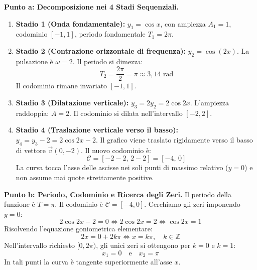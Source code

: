 \documentclass[11pt,a4paper,oneside]{report}
\begin{document}
\begin{dimostrazione}
\textbf{Punto a: Decomposizione nei 4 Stadi Sequenziali.}
\begin{enumerate}
    \item \textbf{Stadio 1 (Onda fondamentale):} $y_1 = \cos x$, con ampiezza $A_1 = 1$, codominio $[-1, 1]$, periodo fondamentale $T_1 = 2\pi$.
    \item \textbf{Stadio 2 (Contrazione orizzontale di frequenza):} $y_2 = \cos(2x)$. La pulsazione è $\omega = 2$. Il periodo si dimezza:
    \begin{equation*}
        T_2 = \frac{2\pi}{2} = \pi \approx 3{,}14\text{ rad}
    \end{equation*}
    Il codominio rimane invariato $[-1, 1]$.
    \item \textbf{Stadio 3 (Dilatazione verticale):} $y_3 = 2 y_2 = 2\cos 2x$. L'ampiezza raddoppia: $A = 2$. Il codominio si dilata nell'intervallo $[-2, 2]$.
    \item \textbf{Stadio 4 (Traslazione verticale verso il basso):} $y_4 = y_3 - 2 = 2\cos 2x - 2$. Il grafico viene traslato rigidamente verso il basso di vettore $\vec{v}(0, -2)$. Il nuovo codominio è:
    \begin{equation*}
        \mathcal{C} = [-2 - 2, \, 2 - 2] = [-4, \, 0]
    \end{equation*}
    La curva tocca l'asse delle ascisse nei soli punti di massimo relativo ($y = 0$) e non assume mai quote strettamente positive.
\end{enumerate}

\textbf{Punto b: Periodo, Codominio e Ricerca degli Zeri.}
Il periodo della funzione è $T = \pi$. Il codominio è $\mathcal{C} = [-4, 0]$.
Cerchiamo gli zeri imponendo $y = 0$:
\begin{equation*}
    2\cos 2x - 2 = 0 \iff 2\cos 2x = 2 \iff \cos 2x = 1
\end{equation*}
Risolvendo l'equazione goniometrica elementare:
\begin{equation*}
    2x = 0 + 2k\pi \iff x = k\pi, \quad k \in \mathbb{Z}
\end{equation*}
Nell'intervallo richiesto $[0, 2\pi)$, gli unici zeri si ottengono per $k = 0$ e $k = 1$:
\begin{equation}
    x_1 = 0 \quad \text{e} \quad x_2 = \pi
\end{equation}
In tali punti la curva è tangente superiormente all'asse $x$.


\end{dimostrazione}
\end{document}
